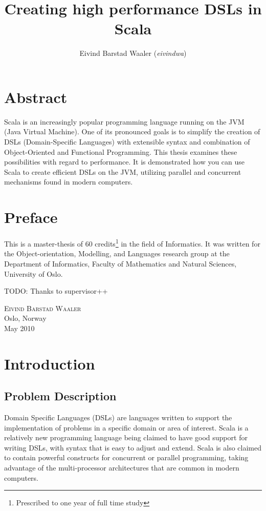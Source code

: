 \documentclass[a4paper,english]{report}
\title{Creating high performance DSLs in Scala}
\author{Eivind Barstad Waaler (\emph{eivindwa})}
\begin{document}
\uiosloforside[kind={Master thesis},boxcolor=matnat,textcolor=white]

\chapter*{Abstract}

Scala is an increasingly popular programming language running on the
JVM (Java Virtual Machine). One of its pronounced goals is to simplify
the creation of DSLs (Domain-Specific Languages) with extensible
syntax and combination of Object-Oriented and Functional
Programming. This thesis examines these possibilities with regard to
performance. It is demonstrated how you can use Scala to create
efficient DSLs on the JVM, utilizing parallel and concurrent
mechanisms found in modern computers.

\tableofcontents

\listoftables

\listoffigures

\chapter*{Preface}

This is a master-thesis of 60 credits\footnote{Prescribed to one year
  of full time study} in the field of Informatics. It was written for
the Object-orientation, Modelling, and Languages research
group\cite{oms} at the Department of Informatics, Faculty of
Mathematics and Natural Sciences, University of Oslo.

TODO: Thanks to supervisor++

\begin{flushright}
\textsc{Eivind Barstad Waaler}\\
Oslo, Norway\\
May 2010
\end{flushright}

\chapter{Introduction}
\label{sec:introduction}

\section{Problem Description}
\label{sec:problemdesc}

Domain Specific Languages (DSLs) are languages written to support the
implementation of problems in a specific domain or area of
interest\cite{mer05}. Scala is a relatively new programming language
being claimed to have good support for writing DSLs\cite{scala}, with
syntax that is easy to adjust and extend\cite{ode08}. Scala is also
claimed to contain powerful constructs for concurrent or parallel
programming, taking advantage of the multi-processor architectures
that are common in modern computers.
\end{document}
